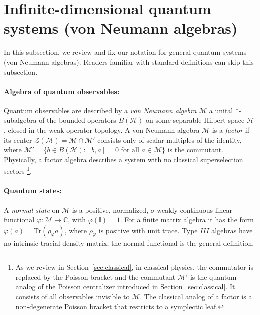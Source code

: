 \documentclass[a4paper,11pt]{article}
\theoremstyle{definition}
\newcommand{\id}{\mathbb{I}}
\newcommand{\Tr}{\text{Tr}}
\begin{document}
\section{Infinite-dimensional quantum systems (von Neumann algebras)}

In this subsection, we review and fix our notation for general quantum systems (von Neumann algebras). Readers familiar with standard definitions can skip this subsection.

\paragraph{Algebra of quantum observables:}
Quantum observables are described by a 
\emph{von Neumann algebra} $\mathcal M$ a unital $*$-subalgebra of the bounded operators
$B(\mathcal{H})$ on some separable Hilbert space $\mathcal{H}$, closed in the
weak operator topology.
A von Neumann algebra $\mathcal M$ is a \emph{factor} if its center
$\mathcal{Z}(\mathcal M) = \mathcal M\cap\mathcal M'$ consists only of scalar multiples
of the identity, where $\mathcal M' = \{b\in B(\mathcal{H}) : [b,a]=0\text{ for all }a\in\mathcal M\}$
is the commutant.  Physically, a factor algebra describes a system with no classical
superselection sectors \footnote{As we review in Section~\ref{sec:classical}, in classical physics, the commutator is replaced by the Poisson bracket and the commutant $\mathcal M'$ is the quantum analog of the Poisson
centralizer introduced in Section~\ref{sec:classical}. It consists of all observables invisible to $\mathcal M$. The classical analog of a factor is a non-degenerate Poisson bracket that restricts to a symplectic leaf.}.

\paragraph{Quantum states:}

A \emph{normal state} on $\mathcal M$ is a positive, normalized, $\sigma$-weakly continuous
linear functional $\varphi:\mathcal M\to\mathbb{C}$, with $\varphi(\id)=1$.
For a finite matrix algebra it has the form $\varphi(a)=\Tr(\rho_\varphi a)$,
where $\rho_\varphi$ is positive with unit trace. Type $III$ algebras have no
intrinsic tracial density matrix; the normal functional is the general definition.
\end{document}
